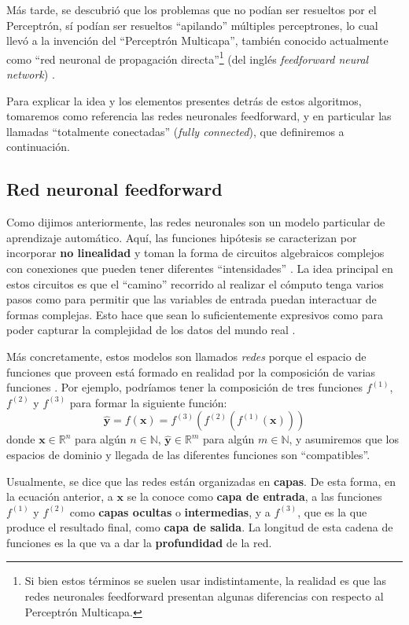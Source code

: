 \documentclass[../../main.tex]{subfiles}
\begin{document}
Más tarde, se descubrió que los problemas que no podían ser resueltos por el Perceptrón,
sí podían ser resueltos ``apilando'' múltiples perceptrones, lo cual llevó a la invención
del ``Perceptrón Multicapa'', también conocido actualmente como ``red neuronal de
propagación directa''\footnote{Si bien estos términos se suelen usar indistintamente, la
realidad es que las redes neuronales feedforward presentan algunas diferencias con
respecto al Perceptrón Multicapa.} (del inglés \textit{feedforward neural network})
\cite{deep-learning}.

Para explicar la idea y los elementos presentes detrás de estos algoritmos, tomaremos como
referencia las redes neuronales feedforward, y en particular las llamadas ``totalmente
conectadas'' (\textit{fully connected}), que definiremos a continuación.

\subsection{Red neuronal feedforward}
Como dijimos anteriormente, las redes neuronales son un modelo particular de aprendizaje
automático. Aquí, las funciones hipótesis se caracterizan por incorporar \textbf{no
linealidad} y toman la forma de circuitos algebraicos complejos con conexiones que pueden
tener diferentes ``intensidades'' \cite{ai-a-modern-approach}. La idea principal en estos
circuitos es que el ``camino'' recorrido al realizar el cómputo tenga varios pasos como
para permitir que las variables de entrada puedan interactuar de formas complejas. Esto
hace que sean lo suficientemente expresivos como para poder capturar la complejidad de los
datos del mundo real \cite{ai-a-modern-approach}.

Más concretamente, estos modelos son llamados \textit{redes} porque el espacio de
funciones que proveen está formado en realidad por la composición de varias funciones
\cite{deep-learning}. Por ejemplo, podríamos tener la composición de tres funciones
\(f^{(1)}\), \(f^{(2)}\) y \(f^{(3)}\) para formar la siguiente función:
\begin{equation}
    \hat{\bm{y}} = f(\bm{x}) = f^{(3)}(f^{(2)}(f^{(1)}(\bm{x})))
    \label{eq:fun-composition}
\end{equation}
donde \(\bm{x} \in \mathbb{R}^n\) para algún \(n \in \mathbb{N}\), \(\hat{\bm{y}} \in
\mathbb{R}^m\) para algún \(m \in \mathbb{N}\), y asumiremos que los espacios de dominio y
llegada de las diferentes funciones son ``compatibles''.

Usualmente, se dice que las redes están organizadas en \textbf{capas}. De esta forma, en
la ecuación anterior, a \(\bm{x}\) se la conoce como \textbf{capa de entrada}, a las
funciones \(f^{(1)}\) y \(f^{(2)}\) como \textbf{capas ocultas} o \textbf{intermedias}, y
a \(f^{(3)}\), que es la que produce el resultado final, como \textbf{capa de salida}. La
longitud de esta cadena de funciones es la que va a dar la \textbf{profundidad} de la red.
\end{document}
